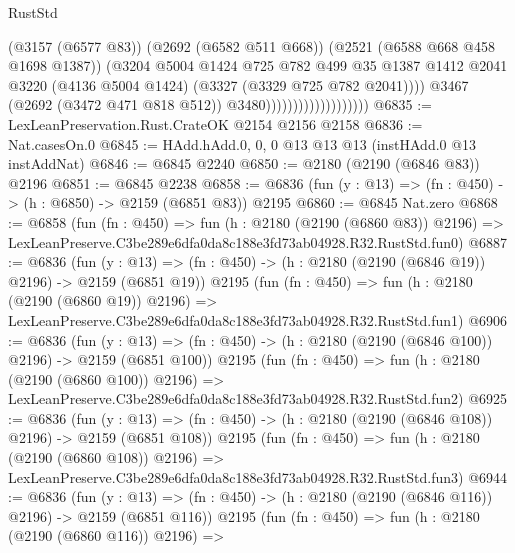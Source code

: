 \begin{lexlean}{RustStd}
\begin{coremodule}
                                            (@3157 (@6577 @83))
                                            (@2692 (@6582 @511 @668))
                                            (@2521 (@6588 @668 @458 @1698 @1387))
                                            (@3204
                                              @5004
                                              @1424
                                              @725
                                              @782
                                              @499
                                              @35
                                              @1387
                                              @1412
                                              @2041
                                              @3220
                                              (@4136 @5004 @1424)
                                              (@3327 (@3329 @725 @782 @2041))))
                                          @3467
                                          (@2692 (@3472 @471 @818 @512))
                                          @3480)))))))))))))))))))
@6835 := LexLeanPreservation.Rust.CrateOK @2154 @2156 @2158
@6836 := Nat.casesOn.{0}
@6845 := HAdd.hAdd.{0, 0, 0} @13 @13 @13 (instHAdd.{0} @13 instAddNat)
@6846 := @6845 @2240
@6850 := @2180 (@2190 (@6846 @83)) @2196
@6851 := @6845 @2238
@6858 := @6836 (fun (y : @13) => (fn : @450) -> (h : @6850) -> @2159 (@6851 @83)) @2195
@6860 := @6845 Nat.zero
@6868 := @6858
    (fun (fn : @450) =>
    fun (h : @2180 (@2190 (@6860 @83)) @2196) =>
    LexLeanPreserve.C3be289e6dfa0da8c188e3fd73ab04928.R32.RustStd.fun0)
@6887 := @6836
    (fun (y : @13) => (fn : @450) -> (h : @2180 (@2190 (@6846 @19)) @2196) -> @2159 (@6851 @19))
    @2195
    (fun (fn : @450) =>
    fun (h : @2180 (@2190 (@6860 @19)) @2196) =>
    LexLeanPreserve.C3be289e6dfa0da8c188e3fd73ab04928.R32.RustStd.fun1)
@6906 := @6836
    (fun (y : @13) => (fn : @450) -> (h : @2180 (@2190 (@6846 @100)) @2196) -> @2159 (@6851 @100))
    @2195
    (fun (fn : @450) =>
    fun (h : @2180 (@2190 (@6860 @100)) @2196) =>
    LexLeanPreserve.C3be289e6dfa0da8c188e3fd73ab04928.R32.RustStd.fun2)
@6925 := @6836
    (fun (y : @13) => (fn : @450) -> (h : @2180 (@2190 (@6846 @108)) @2196) -> @2159 (@6851 @108))
    @2195
    (fun (fn : @450) =>
    fun (h : @2180 (@2190 (@6860 @108)) @2196) =>
    LexLeanPreserve.C3be289e6dfa0da8c188e3fd73ab04928.R32.RustStd.fun3)
@6944 := @6836
    (fun (y : @13) => (fn : @450) -> (h : @2180 (@2190 (@6846 @116)) @2196) -> @2159 (@6851 @116))
    @2195
    (fun (fn : @450) =>
    fun (h : @2180 (@2190 (@6860 @116)) @2196) =>

\end{coremodule}
\end{lexlean}

